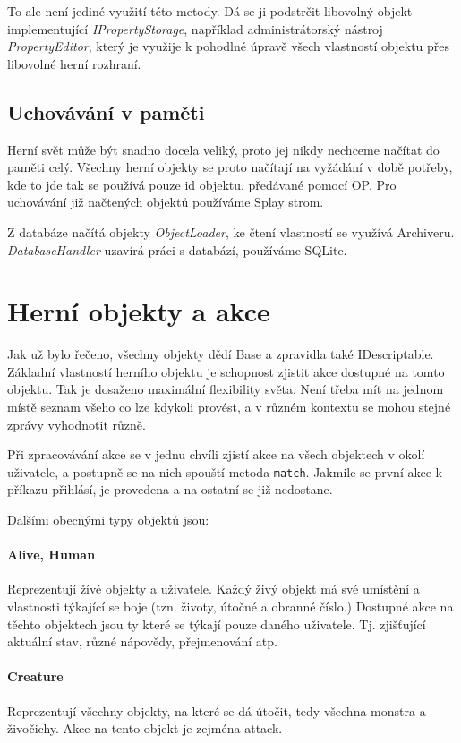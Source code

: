 \documentclass[11pt, a4paper]{article}
\def\class#1{\emph{#1}}
\begin{document}
To ale není jediné využití této metody. Dá se ji podstrčit libovolný objekt implementující \class{IPropertyStorage}, například administrátorský nástroj \class{PropertyEditor}, který je využije k pohodlné úpravě všech vlastností objektu přes libovolné herní rozhraní.

\subsection{Uchovávání v paměti}

Herní svět může být snadno docela veliký, proto jej nikdy nechceme načítat do paměti celý. Všechny herní objekty se proto načítají na vyžádání v době potřeby, kde to jde tak se používá pouze id objektu, předávané pomocí OP. Pro uchovávání již načtených objektů používáme Splay strom.

Z databáze načítá objekty \class{ObjectLoader}, ke čtení vlastností se využívá Archiveru. \class{DatabaseHandler} uzavírá práci s databází, používáme SQLite.

\section{Herní objekty a akce}

Jak už bylo řečeno, všechny objekty dědí Base a zpravidla také IDescriptable. Základní vlastností herního objektu je schopnost zjistit akce dostupné na tomto objektu. Tak je dosaženo maximální flexibility světa. Není třeba mít na jednom místě seznam všeho co lze kdykoli provést, a v různém kontextu se mohou stejné zprávy vyhodnotit různě. 

Při zpracovávání akce se v jednu chvíli zjistí akce na všech objektech v okolí uživatele, a postupně se na nich spouští metoda \texttt{match}. Jakmile se první akce k příkazu přihlásí, je provedena a na ostatní se již nedostane.

Dalšími obecnými typy objektů jsou:

\paragraph{Alive, Human} Reprezentují žívé objekty a uživatele. Každý živý objekt má své umístění a vlastnosti týkající se boje (tzn. životy, útočné a obranné číslo.) Dostupné akce na těchto objektech jsou ty které se týkají pouze daného uživatele. Tj. zjišťující aktuální stav, různé nápovědy, přejmenování atp.

\paragraph{Creature} Reprezentují všechny objekty, na které se dá útočit, tedy všechna monstra a živočichy. Akce na tento objekt je zejména attack.
\end{document}
